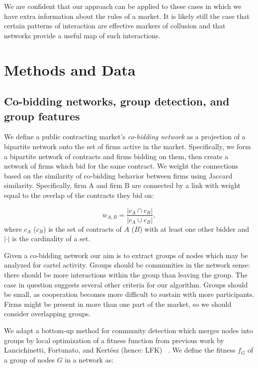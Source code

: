 We are confident that our approach can be applied to these cases in which we have extra information about the rules of a market. It is likely still the case that certain patterns of interaction are effective markers of collusion and that networks provide a useful map of such interactions.


\section{Methods and Data}

\subsection{Co-bidding networks, group detection, and group features}
We define a public contracting market's \textit{co-bidding network} as a projection of a bipartite network onto the set of firms active in the market. Specifically, we form a bipartite network of contracts and firms bidding on them, then create a network of firms which bid for the same contract. We weight the connections based on the similarity of co-bidding behavior between firms using Jaccard similarity. Specifically, firm A and firm B are connected by a link with weight equal to the overlap of the contracts they bid on:

$$w_{A,B} = \dfrac{\lvert c_{A} \cap  c_{B}\rvert}{\lvert c_{A} \cup  c_{B}\rvert},$$
where $c_{A}$ ($c_{B}$) is the set of contracts of $A$ ($B$) with at least one other bidder and $|\cdot|$ is the cardinality of a set.

Given a co-bidding network our aim is to extract groups of nodes which may be analyzed for cartel activity. Groups should be communities in the network sense: there should be more interactions within the group than leaving the group. The case in question suggests several other criteria for our algorithm. Groups should be small, as cooperation becomes more difficult to sustain with more participants. Firms might be present in more than one part of the market, so we should consider overlapping groups.

We adapt a bottom-up method for community detection which merges nodes into groups by local optimization of a fitness function from previous work by Lancichinetti, Fortunato, and Kert\'esz (hence: LFK) ~\cite{lancichinetti2009detecting}. We define the fitness $f_{G}$ of a group of nodes $G$ in a network as:

